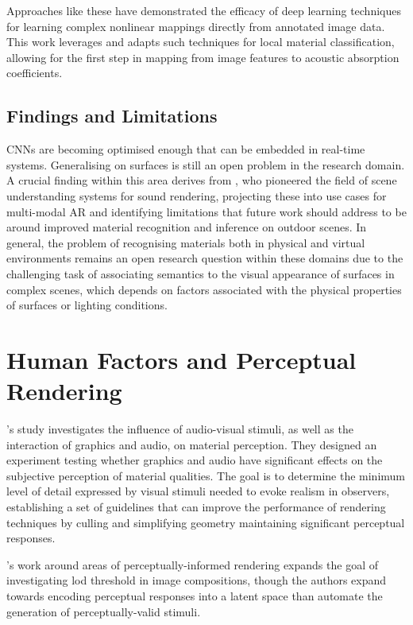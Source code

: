 Approaches like these have demonstrated the efficacy of deep learning techniques for learning complex nonlinear mappings directly from annotated image data. This work leverages and adapts such techniques for local material classification, allowing for the first step in mapping from image features to acoustic absorption coefficients.

\subsection{Findings and Limitations}
CNNs are becoming optimised enough that can be embedded in real-time systems. Generalising on surfaces is still an open problem in the research domain.
A crucial finding within this area derives from \cite{schissler2017acoustic}, who pioneered the field of scene understanding systems for sound rendering, projecting these into use cases for multi-modal AR and identifying limitations that future work should address to be around improved material recognition and inference on outdoor scenes. In general, the problem of recognising materials both in physical and virtual environments remains an open research question within these domains due to the challenging task of associating semantics to the visual appearance of surfaces in complex scenes, which depends on factors associated with the physical properties of surfaces or lighting conditions.  

\section{Human Factors and Perceptual Rendering}
\cite{bonneel2010bimodal}'s study investigates the influence of audio-visual stimuli, as well as the interaction of graphics and audio, on material perception. They designed an experiment testing whether graphics and audio have significant effects on the subjective perception of material qualities. The goal is to determine the minimum level of detail expressed by visual stimuli needed to evoke realism in observers, establishing a set of guidelines that can improve the performance of rendering techniques by culling and simplifying geometry maintaining significant perceptual responses.

\cite{Dolhasz_2020_CVPR}'s work around areas of perceptually-informed rendering expands the goal of investigating \acrshort{lod} threshold in image compositions, though the authors expand towards encoding perceptual responses into a latent space than automate the generation of perceptually-valid stimuli. 

